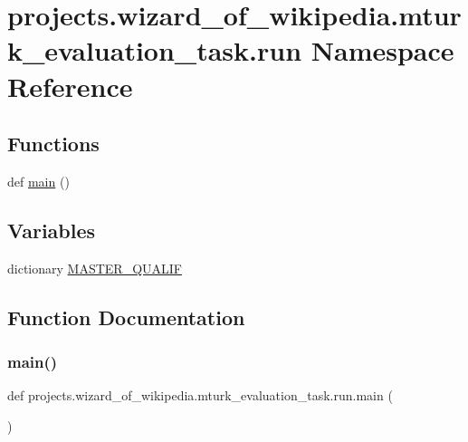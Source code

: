 \hypertarget{namespaceprojects_1_1wizard__of__wikipedia_1_1mturk__evaluation__task_1_1run}{}\section{projects.\+wizard\+\_\+of\+\_\+wikipedia.\+mturk\+\_\+evaluation\+\_\+task.\+run Namespace Reference}
\label{namespaceprojects_1_1wizard__of__wikipedia_1_1mturk__evaluation__task_1_1run}
\subsection*{Functions}
\begin{DoxyCompactItemize}
\item 
def \hyperlink{namespaceprojects_1_1wizard__of__wikipedia_1_1mturk__evaluation__task_1_1run_ad3ab2c71f8083c3112815c0b363d316b}{main} ()
\end{DoxyCompactItemize}
\subsection*{Variables}
\begin{DoxyCompactItemize}
\item 
dictionary \hyperlink{namespaceprojects_1_1wizard__of__wikipedia_1_1mturk__evaluation__task_1_1run_ad641335aba4eaadc1b11538d063449f3}{M\+A\+S\+T\+E\+R\+\_\+\+Q\+U\+A\+L\+IF}
\end{DoxyCompactItemize}


\subsection{Function Documentation}
\mbox{\label{namespaceprojects_1_1wizard__of__wikipedia_1_1mturk__evaluation__task_1_1run_ad3ab2c71f8083c3112815c0b363d316b}} 
\subsubsection{\texorpdfstring{main()}{main()}}
{\footnotesize\ttfamily def projects.\+wizard\+\_\+of\+\_\+wikipedia.\+mturk\+\_\+evaluation\+\_\+task.\+run.\+main (\begin{DoxyParamCaption}{ }\end{DoxyParamCaption})}

